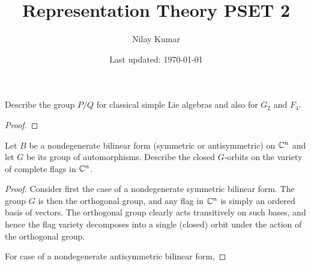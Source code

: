 \documentclass{../../mathnotes}
\title{Representation Theory PSET 2}
\author{Nilay Kumar}
\date{Last updated: \today}
\begin{document}
\maketitle

\begin{exc}
    Describe the group $P/Q$ for classical simple Lie algebras and also for $G_2$
    and $F_4$.
\end{exc}
\begin{proof}
\end{proof}

\begin{exc}
    Let $B$ be a nondegenerate bilinear form (symmetric or antisymmetric) on $\mathbb{C}^n$
    and let $G$ be its group of automorphisms. Describe the closed $G$-orbits on the
    variety of complete flags in $\mathbb{C}^n$.
\end{exc}
\begin{proof}
    Consider first the case of a nondegenerate symmetric bilinear form. The group
    $G$ is then the orthogonal group, and any flag in $\mathbb{C}^n$ is simply an ordered
    basis of vectors. The orthogonal group clearly acts transitively on such bases,
    and hence the flag variety decomposes into a single (closed) orbit under the action
    of the orthogonal group.

    For case of a nondegenerate antisymmetric bilinear form, 
\end{proof}
\end{document}
